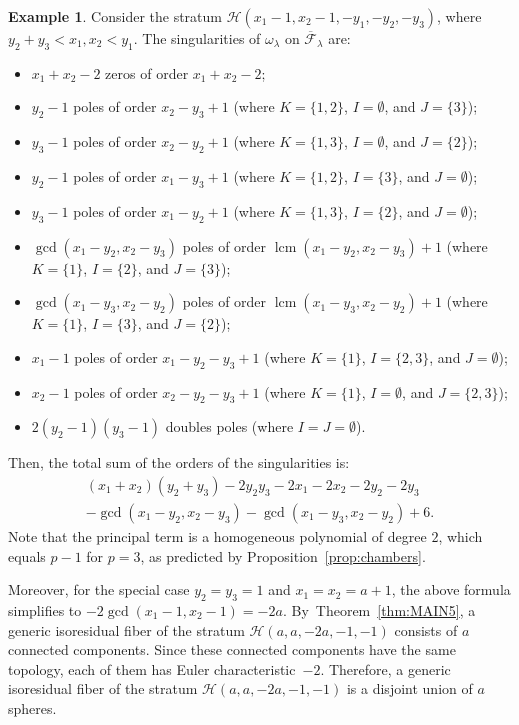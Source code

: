 \documentclass[JEP,XML,SOM,Unicode,NoFloatCountersInSection,published]{cedram}
\DeclareMathOperator{\lcm}{lcm}
\theoremstyle{definition}
\newtheorem{ex}[thm]{Example}
\begin{document}
\begin{ex}
Consider the stratum $\mathcal{H}(x_{1}-1,x_{2}-1,-y_{1},-y_{2},-y_{3})$, where $y_{2}+y_{3}<x_{1},x_{2}<y_{1}$. The singularities of $\omega_{\lambda}$ on $\overline{\mathcal F}_\lambda$ are:
\begin{itemize}
\item $x_{1}+x_{2}-2$ zeros of order $x_{1}+x_{2}-2$;
\item $y_{2}-1$ poles of order $x_{2}-y_{3}+1$ (where $K=\lbrace{ 1,2 \rbrace}$, $I=\emptyset$, and $J=\lbrace{ 3 \rbrace}$);
\item $y_{3}-1$ poles of order $x_{2}-y_{2}+1$ (where $K=\lbrace{ 1,3 \rbrace}$, $I=\emptyset$, and $J=\lbrace{ 2 \rbrace}$);
\item $y_{2}-1$ poles of order $x_{1}-y_{3}+1$ (where $K=\lbrace{ 1,2 \rbrace}$, $I=\lbrace{ 3 \rbrace}$, and $J=\emptyset$);
\item $y_{3}-1$ poles of order $x_{1}-y_{2}+1$ (where $K=\lbrace{ 1,3 \rbrace}$, $I=\lbrace{ 2 \rbrace}$, and $J=\emptyset$);
\item $\gcd(x_{1}-y_{2},x_{2}-y_{3})$ poles of order $\lcm(x_{1}-y_{2},x_{2}-y_{3})+1$ (where $K=\lbrace{ 1 \rbrace}$, $I=\lbrace{ 2 \rbrace}$, and $J=\lbrace{ 3 \rbrace}$);
\item $\gcd(x_{1}-y_{3},x_{2}-y_{2})$ poles of order $\lcm(x_{1}-y_{3},x_{2}-y_{2})+1$ (where $K=\lbrace{ 1 \rbrace}$, $I=\lbrace{ 3 \rbrace}$, and $J=\lbrace{ 2 \rbrace}$);
\item $x_{1}-1$ poles of order $x_{1}-y_{2}-y_{3}+1$ (where $K=\lbrace{ 1 \rbrace}$, $I=\lbrace{2,3 \rbrace}$, and $J=\emptyset$);
\item $x_{2}-1$ poles of order $x_{2}-y_{2}-y_{3}+1$ (where $K=\lbrace{ 1 \rbrace}$, $I=\emptyset$, and $J=\lbrace{2,3 \rbrace}$);
\item $2(y_{2}-1)(y_{3}-1)$ doubles poles (where $I=J=\emptyset$).
\end{itemize}
Then, the total sum of the orders of the singularities is:
\begin{multline*}
(x_{1}+x_{2})(y_{2}+y_{3})
-2y_{2}y_{3}
-2x_{1}
-2x_{2}
-2y_{2}
-2y_{3}\\
-\gcd(x_{1}-y_{2},x_{2}-y_{3})
-\gcd(x_{1}-y_{3},x_{2}-y_{2})
+6.
\end{multline*}
Note that the principal term is a homogeneous polynomial of degree $2$, which equals $p-1$ for $p=3$, as predicted by Proposition~\ref{prop:chambers}.

Moreover, for the special case $y_{2}=y_{3}=1$ and $x_1 = x_2 = a+1$, the above formula simplifies to $-2\gcd(x_{1}-1,x_{2}-1) = -2a$. By~Theorem~\ref{thm:MAIN5},
a generic isoresidual fiber of the stratum $\mathcal{H}(a,a,-2a,-1,-1)$ consists of $a$ connected components. Since these connected components have the same topology, each of them has Euler characteristic~$-2$. Therefore, a generic isoresidual fiber of the stratum $\mathcal{H}(a,a,-2a,-1,-1)$ is a disjoint union of $a$ spheres.
\end{ex}
\end{document}
